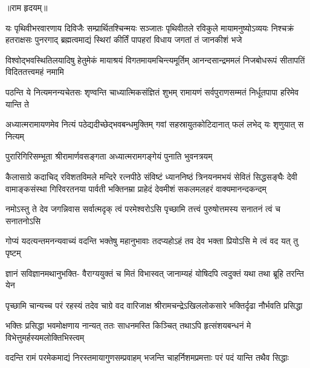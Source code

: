 


॥राम हृदयम्॥

\fourlineindentedshloka
{यः पृथिवीभरवारणाय दिविजैः सम्प्रार्थितश्चिन्मयः}
{सञ्जातः पृथिवीतले रविकुले मायामनुष्योऽव्ययः}
{निश्चक्रं हतराक्षसः पुनरगाद् ब्रह्मत्वमाद्यं स्थिरां}
{कीर्तिं पापहरां विधाय जगतां तं जानकीशं भजे} %

\fourlineindentedshloka
{विश्वोद्भवस्थितिलयादिषु हेतुमेकं}
{मायाश्रयं विगतमायमचिन्त्यमूर्तिम्}
{आनन्दसान्द्रममलं निजबोधरूपं}
{सीतापतिं विदिततत्त्वमहं नमामि} %

\fourlineindentedshloka
{पठन्ति ये नित्यमनन्यचेतसः}
{शृण्वन्ति चाध्यात्मिकसंज्ञितं शुभम्}
{रामायणं सर्वपुराणसम्मतं}
{निर्धूतपापा हरिमेव यान्ति ते} %

\fourlineindentedshloka
{अध्यात्मरामायणमेव नित्यं}
{पठेद्यदीच्छेद्भवबन्धमुक्तिम्}
{गवां सहस्रायुतकोटिदानात्}
{फलं लभेद् यः शृणुयात् स नित्यम्} %

\twolineshloka
{पुरारिगिरिसम्भूता श्रीरामार्णवसङ्गता}
{अध्यात्मरामगङ्गेयं पुनाति भुवनत्रयम्} %

\fourlineindentedshloka
{कैलासाग्रे कदाचिद् रविशतविमले मन्दिरे रत्नपीठे}
{संविष्टं ध्याननिष्ठं त्रिनयनमभयं सेवितं सिद्धसङ्घैः}
{देवी वामाङ्कसंस्था गिरिवरतनया पार्वती भक्तिनम्रा}
{प्राहेदं देवमीशं सकलमलहरं वाक्यमानन्दकन्दम्} %


\fourlineindentedshloka
{नमोऽस्तु ते देव जगन्निवास}
{सर्वात्मदृक् त्वं परमेश्वरोऽसि}
{पृच्छामि तत्त्वं पुरुषोत्तमस्य}
{सनातनं त्वं च सनातनोऽसि} %

\fourlineindentedshloka
{गोप्यं यदत्यन्तमनन्यवाच्यं}
{वदन्ति भक्तेषु महानुभावाः}
{तदप्यहोऽहं तव देव भक्ता}
{प्रियोऽसि मे त्वं वद यत् तु पृष्टम्} %

\fourlineindentedshloka
{ज्ञानं सविज्ञानमथानुभक्ति-}
{वैराग्ययुक्तं च मितं विभास्वत्}
{जानाम्यहं योषिदपि त्वदुक्तं}
{यथा तथा ब्रूहि तरन्ति येन} %

\fourlineindentedshloka
{पृच्छामि चान्यच्च परं रहस्यं}
{तदेव चाग्रे वद वारिजाक्ष}
{श्रीरामचन्द्रेऽखिललोकसारे}
{भक्तिर्दृढा नौर्भवति प्रसिद्धा} %

\fourlineindentedshloka
{भक्तिः प्रसिद्धा भवमोक्षणाय}
{नान्यत् ततः साधनमस्ति किञ्चित्}
{तथाऽपि हृत्संशयबन्धनं मे}
{विभेत्तुमर्हस्यमलोक्तिभिस्त्वम्} %

\fourlineindentedshloka
{वदन्ति रामं परमेकमाद्यं}
{निरस्तमायागुणसम्प्रवाहम्}
{भजन्ति चाहर्निशमप्रमत्ताः}
{परं पदं यान्ति तथैव सिद्धाः} %

